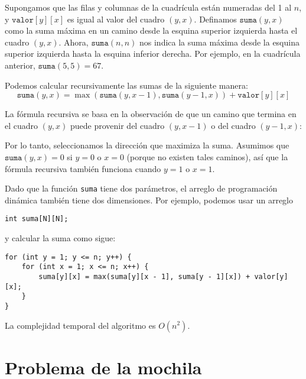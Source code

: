 Supongamos que las filas y columnas de la
cuadrícula están numeradas del 1 al $n$,
y $\texttt{valor}[y][x]$ es igual al valor
del cuadro $(y,x)$.
Definamos $\texttt{suma}(y,x)$ como la suma máxima
en un camino desde la esquina superior izquierda
hasta el cuadro $(y,x)$.
Ahora, $\texttt{suma}(n,n)$ nos indica
la suma máxima
desde la esquina superior izquierda hasta
la esquina inferior derecha.
Por ejemplo, en la cuadrícula anterior,
$\texttt{suma}(5,5)=67$.

Podemos calcular recursivamente las sumas
de la siguiente manera:
\[ \texttt{suma}(y,x) = \max(\texttt{suma}(y,x-1),\texttt{suma}(y-1,x))+\texttt{valor}[y][x]\]

La fórmula recursiva se basa en la observación
de que un camino que termina en el cuadro $(y,x)$
puede provenir del cuadro $(y,x-1)$
o del cuadro $(y-1,x)$:
\begin{center}
\end{center}

Por lo tanto, seleccionamos la dirección que maximiza
la suma.
Asumimos que $\texttt{suma}(y,x)=0$
si $y=0$ o $x=0$ (porque no existen tales caminos),
así que la fórmula recursiva también funciona cuando $y=1$ o $x=1$.

Dado que la función \texttt{suma} tiene dos parámetros,
el arreglo de programación dinámica también tiene dos dimensiones.
Por ejemplo, podemos usar un arreglo
\begin{lstlisting}
int suma[N][N];
\end{lstlisting}
y calcular la suma como sigue:
\begin{lstlisting}
for (int y = 1; y <= n; y++) {
    for (int x = 1; x <= n; x++) {
        suma[y][x] = max(suma[y][x - 1], suma[y - 1][x]) + valor[y][x];
    }
}
\end{lstlisting}
La complejidad temporal del algoritmo es $O(n^2)$.

\section{Problema de la mochila}


